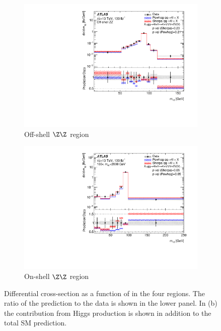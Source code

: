 \begin{figure}[H]
\begin{subfigure}{.49\textwidth}
      \includegraphics[width=.95\linewidth]{Figures/m4l/UnfoldedResults/Unfolded_Data_m12_m4loffshell.pdf}  
      \caption{Off-shell $\Z\Z$ region}
      \label{fig:sub-third}
    \end{subfigure}
    \begin{subfigure}{.49\textwidth}
      \centering
      \includegraphics[width=.95\linewidth]{Figures/m4l/UnfoldedResults/Unfolded_Data_m12_m4l180-2000.pdf}  
      \caption{On-shell $\Z\Z$ region}
      \label{fig:sub-fourth}
    \end{subfigure}
    \caption{Differential cross-section as a function of \mZOne{} in the four
        \mFourL{} regions. \errorbars{} \SMpredictions{} \Pvalue{} The ratio of the \SHERPA{} prediction to the data is shown in the lower panel. In (b) the contribution from Higgs production is shown in addition to the total SM prediction.}
    \label{fig:m12_m4l}
\end{figure}
